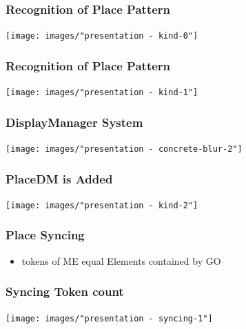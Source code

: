 \begin{frame}
  \frametitle{Recognition of Place Pattern}
  \hspace{-1cm}
  \centering
  \texttt{[image: images/"presentation - kind-0"]}
\end{frame}

\begin{frame}
  \frametitle{Recognition of Place Pattern}
  \hspace{-1cm}
  \centering
  \texttt{[image: images/"presentation - kind-1"]}
\end{frame}

\begin{frame}
  \frametitle{DisplayManager System}
  \hspace{-1cm}
  \centering
  \texttt{[image: images/"presentation - concrete-blur-2"]}
\end{frame}

\begin{frame}
  \frametitle{PlaceDM is Added}
  \hspace{-1cm}
  \centering
  \texttt{[image: images/"presentation - kind-2"]}
\end{frame}




\begin{frame}
  \frametitle{Place Syncing}
  \begin{itemize}
    \item tokens of ME equal Elements contained by GO
  \end{itemize}
\end{frame}

\begin{frame}
  \frametitle{Syncing Token count}
  \hspace{-1cm}
  \centering
  \texttt{[image: images/"presentation - syncing-1"]}
\end{frame}

